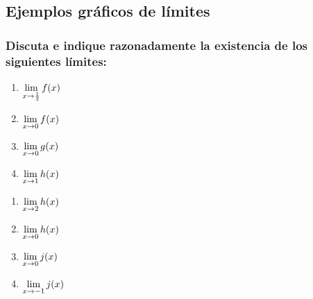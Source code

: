 \documentclass[sans]{apuntes}
\begin{document}
\begin{examplebox}
	\subsection*{Ejemplos gráficos de límites}
	\subsubsection*{Discuta e indique razonadamente la existencia de los siguientes límites:}
	\begin{minipage}[b]{0.45\linewidth}
		\begin{enumerate}[label=\bfseries \arabic*), series=mylist]
			\item \(\displaystyle\lim_{x\to\frac{1}{2}} f(x)\) %
			\item \(\displaystyle\lim_{x \to 0} f(x)\)
			\item $\displaystyle\lim_{x \to 0} g(x)$
			\item $\displaystyle\lim_{x \to 1} h(x)$
		\end{enumerate}
	\end{minipage}
	\begin{minipage}[b]{0.45\linewidth}
		\begin{enumerate}[label=\bfseries \arabic*), resume=mylist]
			\item \(\displaystyle\lim_{x \to 2} h(x)\)
			\item $\displaystyle\lim_{x \to 0} h(x)$
			\item \(\displaystyle\lim_{x \to 0} j(x)\)
			\item $ \displaystyle\lim_{x \to -1} j(x)$
		\end{enumerate}
	\end{minipage}


\end{examplebox}
\end{document}
